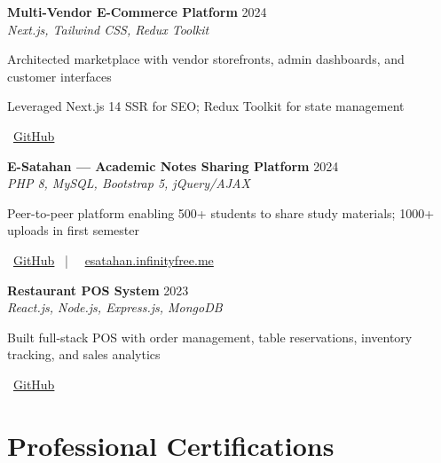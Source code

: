 \documentclass[letterpaper,10pt]{article}
\newenvironment{resume_list}{
  \vspace{-2pt}
  \begin{itemize}[itemsep=1pt, leftmargin=14pt]
}{
  \end{itemize}\vspace{-3pt}
}
\begin{document}
\textbf{Multi-Vendor E-Commerce Platform} \hfill 2024\\
\textit{Next.js, Tailwind CSS, Redux Toolkit}\\
\begin{resume_list}
  \item Architected marketplace with vendor storefronts, admin dashboards, and customer interfaces
  \item Leveraged Next.js 14 SSR for SEO; Redux Toolkit for state management
  \item \faGithub~\href{https://github.com/vindyakodithuwakku02/gocart.git}{GitHub}
\end{resume_list}

\textbf{E-Satahan — Academic Notes Sharing Platform} \hfill 2024\\
\textit{PHP 8, MySQL, Bootstrap 5, jQuery/AJAX}\\
\begin{resume_list}
  \item Peer-to-peer platform enabling 500+ students to share study materials; 1000+ uploads in first semester
  \item \faGithub~\href{https://github.com/Chandima0406/E-Satahan.git}{GitHub} ~|~ \faGlobe~\href{https://esatahan.infinityfree.me}{esatahan.infinityfree.me}
\end{resume_list}

\textbf{Restaurant POS System} \hfill 2023\\
\textit{React.js, Node.js, Express.js, MongoDB}\\
\begin{resume_list}
  \item Built full-stack POS with order management, table reservations, inventory tracking, and sales analytics
  \item \faGithub~\href{https://github.com/vindyakodithuwakku02/pos-system.git}{GitHub}
\end{resume_list}

\section{Professional Certifications}
\vspace{-1pt}
\end{document}
